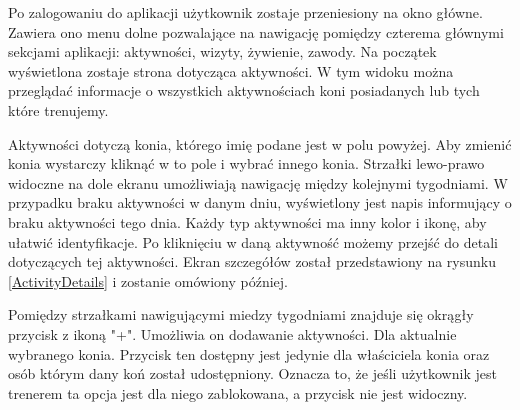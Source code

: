 \documentclass[12pt,twoside]{report}
\begin{document}
Po zalogowaniu do aplikacji użytkownik zostaje przeniesiony na okno główne. Zawiera ono menu dolne pozwalające na nawigację pomiędzy czterema głównymi sekcjami aplikacji: aktywności, wizyty, żywienie, zawody. Na początek wyświetlona zostaje  strona dotycząca aktywności. W tym widoku można przeglądać informacje o wszystkich aktywnościach koni posiadanych lub tych które trenujemy.  

Aktywności dotyczą konia, którego imię podane jest w polu powyżej. Aby zmienić konia wystarczy kliknąć w to pole i wybrać innego konia.
Strzałki lewo-prawo widoczne na dole ekranu umożliwiają nawigację między kolejnymi tygodniami. W przypadku braku aktywności w danym dniu, wyświetlony jest napis informujący o braku aktywności tego dnia. Każdy typ aktywności ma inny kolor i ikonę, aby ułatwić identyfikacje. Po kliknięciu w daną aktywność możemy przejść do detali dotyczących tej aktywności. Ekran szczegółów został przedstawiony na rysunku \ref{ActivityDetails} i zostanie omówiony później.

Pomiędzy strzałkami nawigującymi miedzy tygodniami znajduje się okrągły przycisk z ikoną "+". Umożliwia on dodawanie aktywności. Dla aktualnie wybranego konia. Przycisk ten dostępny jest jedynie dla właściciela konia oraz osób którym dany koń został udostępniony. Oznacza to, że jeśli użytkownik jest trenerem ta opcja jest dla niego zablokowana, a przycisk nie jest widoczny.
\end{document}
